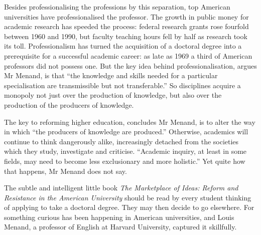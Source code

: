 \begin{listmatch}
\item 
Besides professionalising the professions by this separation,
top American universities have professionalised the professor. The
growth in public money for academic research has speeded the process:
federal research grants rose fourfold between 1960 and 1990, but faculty
teaching hours fell by half as research took its toll. Professionalism
has turned the acquisition of a doctoral degree into a prerequisite for
a successful academic career: as late as 1969 a third of American
professors did not possess one. But the key idea behind
professionalisation, argues Mr Menand, is that ``the knowledge and
skills needed for a particular specialisation are transmissible but not
transferable.'' So disciplines acquire a monopoly not just over the
production of knowledge, but also over the production of the producers
of knowledge.


\item 
The key to reforming higher education, concludes Mr Menand, is
to alter the way in which ``the producers of knowledge are produced.''
Otherwise, academics will continue to think dangerously alike,
increasingly detached from the societies which they study, investigate
and criticise. ``Academic inquiry, at least in some fields, may need to
become less exclusionary and more holistic.'' Yet quite how that
happens, Mr Menand does not say.


\item 
The subtle and intelligent little book \emph{The Marketplace of
	Ideas: Reform and Resistance in the American University} should be read
by every student thinking of applying to take a doctoral degree. They
may then decide to go elsewhere. For something curious has been
happening in American universities, and Louis Menand, a professor of
English at Harvard University, captured it skillfully.

\end{listmatch}


